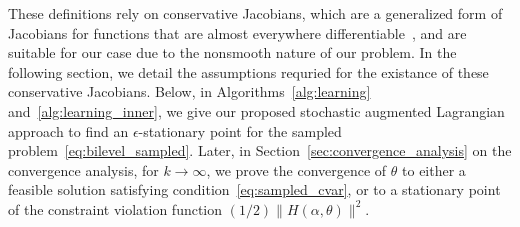 These definitions rely on conservative Jacobians, which are a generalized form of Jacobians for functions that are almost everywhere differentiable~\citep{conservative}, and are suitable for our case due to the nonsmooth nature of our problem. In the following section, we detail the assumptions requried for the existance of these conservative Jacobians. Below, in Algorithms~\ref{alg:learning} and~\ref{alg:learning_inner}, we give our proposed stochastic augmented Lagrangian approach to find an $\epsilon$-stationary point for the sampled problem~\eqref{eq:bilevel_sampled}. 
Later, in Section~\ref{sec:convergence_analysis} on the convergence analysis, for $k \rightarrow \infty$, we prove the convergence of $\theta$ to either a feasible solution satisfying condition~\eqref{eq:sampled_cvar}, or to a stationary point of the constraint violation function $(1/2)\|H(\alpha,\theta)\|^2$.

